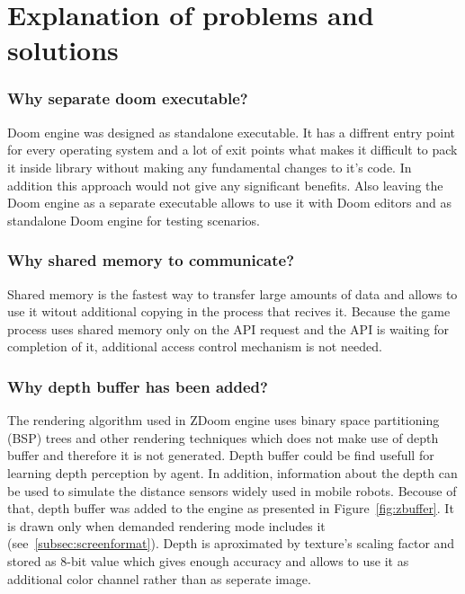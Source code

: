 \section{Explanation of problems and solutions}\label{sec:architecture_solutions}

\subsubsection{Why separate doom executable?}

Doom engine was designed as standalone executable. It has a diffrent entry point for every operating system and a lot of exit points what makes it difficult to pack it inside library without making any fundamental changes to it's code. In addition this approach would not give any significant benefits. Also leaving the Doom engine as a separate executable allows to use it with Doom editors and as standalone Doom engine for testing scenarios.

\subsubsection{Why shared memory to communicate?}

Shared memory is the fastest way to transfer large amounts of data and allows to use it witout additional copying in the process that recives it. 
Because the game process uses shared memory only on the API request and the API is waiting for completion of it, additional access control mechanism is not needed.

\subsubsection{Why depth buffer has been added?}

The rendering algorithm used in ZDoom engine uses binary space partitioning (BSP) trees and other rendering techniques which does not make use of depth buffer and therefore it is not generated.
Depth buffer could be find usefull for learning depth perception by agent.
In addition, information about the depth can be used to simulate the distance sensors widely used in mobile robots.  
Becouse of that, depth buffer was added to the engine as presented in Figure~\ref{fig:zbuffer}.
It is drawn only when demanded rendering mode includes it (see~\ref{subsec:screenformat}).
Depth is aproximated by texture's scaling factor and stored as 8-bit value which gives enough accuracy and allows to use it as additional color channel rather than as seperate image.


